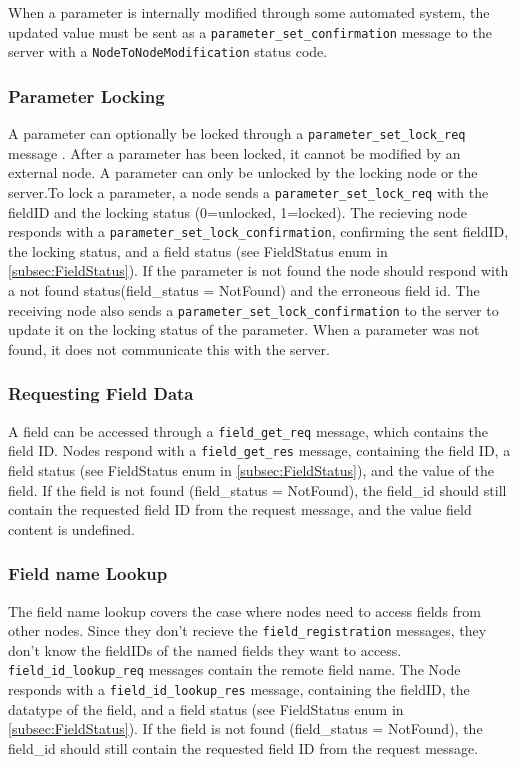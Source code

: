 When a parameter is internally modified through some automated system, the updated value must be sent as a \texttt{parameter\_set\_confirmation} message to the server with a \texttt{NodeToNodeModification} status code.
\subsubsection{Parameter Locking}\label{subsubsec:parameter-locking}

A parameter can optionally be locked through a \texttt{parameter\_set\_lock\_req} message .
After a parameter has been locked, it cannot be modified by an external node.
A parameter can only be unlocked by the locking node or the server.To lock a parameter, a node sends a \texttt{parameter\_set\_lock\_req} with the fieldID and the locking status (0=unlocked, 1=locked). The recieving node responds with a \texttt{parameter\_set\_lock\_confirmation}, confirming the sent fieldID, the locking status, and a field status (see FieldStatus enum in \ref{subsec:FieldStatus}). If the parameter is not found the node should respond with a not found status(field\_status = NotFound) and the erroneous field id. The receiving node also sends a \texttt{parameter\_set\_lock\_confirmation} to the server to update it on the locking status of the parameter. When a parameter was not found, it does not communicate this with the server. 
\paragraph{}
\subsubsection{Requesting Field Data}\label{subsubsec:requesting-field-data}
A field can be accessed through a \texttt{field\_get\_req} message, which contains the field ID.
Nodes respond with a \texttt{field\_get\_res} message, containing the field ID, a field status (see FieldStatus enum in \ref{subsec:FieldStatus}), and the value of the field. If the field is not found (field\_status = NotFound), the field\_id should still contain the requested field ID from the request message, and the value field content is undefined.

\subsubsection{Field name Lookup}\label{subsubsec:field-name-lookup}
The field name lookup covers the case where nodes need to access fields from other nodes. Since they don't recieve the \texttt{field\_registration} messages, they don't know the fieldIDs of the named fields they want to access. \texttt{field\_id\_lookup\_req} messages contain the remote field name. The Node responds with a \texttt{field\_id\_lookup\_res} message, containing the fieldID, the datatype of the field, and a field status (see FieldStatus enum in \ref{subsec:FieldStatus}). If the field is not found (field\_status = NotFound), the field\_id should still contain the requested field ID from the request message.
